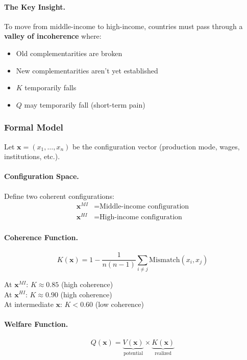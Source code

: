 \paragraph{The Key Insight.}
To move from middle-income to high-income, countries must pass through a 
\textbf{valley of incoherence} where:
\begin{itemize}
    \item Old complementarities are broken
    \item New complementarities aren't yet established
    \item $K$ temporarily falls
    \item $Q$ may temporarily fall (short-term pain)
\end{itemize}

\subsubsection{Formal Model}

Let $\mathbf{x} = (x_1, \ldots, x_n)$ be the configuration vector (production 
mode, wages, institutions, etc.).

\paragraph{Configuration Space.}
Define two coherent configurations:
\begin{align}
\mathbf{x}^{MI} &= \text{Middle-income configuration} \\
\mathbf{x}^{HI} &= \text{High-income configuration}
\end{align}

\paragraph{Coherence Function.}
\begin{equation}
K(\mathbf{x}) = 1 - \frac{1}{n(n-1)} \sum_{i \neq j} \text{Mismatch}(x_i, x_j)
\end{equation}

At $\mathbf{x}^{MI}$: $K \approx 0.85$ (high coherence)\\
At $\mathbf{x}^{HI}$: $K \approx 0.90$ (high coherence)\\
At intermediate $\mathbf{x}$: $K < 0.60$ (low coherence)

\paragraph{Welfare Function.}
\begin{equation}
Q(\mathbf{x}) = \underbrace{V(\mathbf{x})}_{\text{potential}} \times \underbrace{K(\mathbf{x})}_{\text{realized}}
\end{equation}

